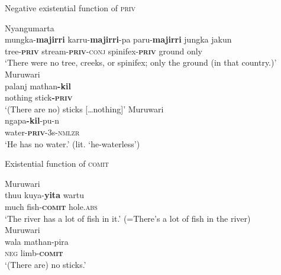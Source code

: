 \documentclass[output=paper]{langsci/langscibook}
\begin{document}
    \begin{exe}\ex\label{ex:austr-negex-function-priv} Negative existential function of \textsc{priv}
    \begin{xlist}
\ex
        \label{ex:austr-negex-function-priv-nyang}
        Nyangumarta\\
\gll mungka-\textbf{majirri} karru-\textbf{majirri}-pa paru-\textbf{majirri} jungka jakun \\
tree\textsc{-\textbf{priv}} stream\textsc{-\textbf{priv}-conj} spinifex\textsc{-\textbf{priv}} ground only\\
\glt `There were no tree, creeks, or spinifex; only the ground (in that country.)'
%
        \ex\label{ex:austr-negex-function-priv-muru} Muruwari\\
\gll  palanj mathan\textbf{-kil}\\
nothing stick\textbf{-\textsc{priv}}\\
\glt `(There are no) sticks [\ldots{}nothing]'
%
\ex\label{ex:austr-negex-function-priv-muru-water} Muruwari\\
\gll  ngapa\textbf{-kil}-pu-n\\
water-\textbf{\textsc{priv}}-3s-\textsc{nmlzr}\\
\glt `He has no water.' (lit. `he-waterless') 
    \end{xlist}
%
\ex\label{ex:austr-exist-function-comit} 
    Existential function of \textsc{comit}
\begin{xlist}
    \ex Muruwari \\
	\gll thuu kuya-\textbf{yita} wartu\\
	much fish-\textsc{\textbf{comit}} hole.\textsc{abs}\\
	\glt `The river has a lot of fish in it.' (=There's a lot of fish in
            the river) \\ \hfill {\citep[73]{Oates1988}}
    \ex\label{ex:austr-exist-function-comit-sticks} Muruwari \\
    \gll wala mathan-pira\\
	\textsc{neg} limb-\textbf{\textsc{comit}}\\
    \glt `(There are) no sticks.' \hfill {\citep[74]{Oates1988}}
        \end{xlist}\end{exe}
\end{document}
